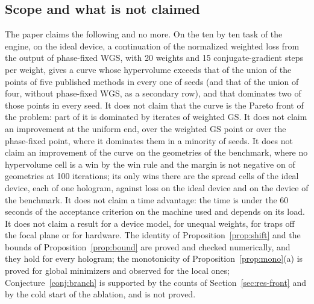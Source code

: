 \subsection{Scope and what is not claimed}\label{sec:scope}

The paper claims the following and no more. On the ten by ten task of the engine, on the ideal device, a continuation of the normalized weighted loss from the output of phase-fixed WGS, with 20 weights and 15 conjugate-gradient steps per weight, gives a curve whose hypervolume exceeds that of the union of the points of five published methods in every one of \nSeeds{} seeds (and that of the union of four, without phase-fixed WGS, as a secondary row), and that dominates two of those points in every seed. It does not claim that the curve is the Pareto front of the problem: part of it is
dominated by iterates of weighted GS. It does not claim an improvement at the uniform end, over the weighted GS point or over the phase-fixed point, where it dominates them in a minority of seeds. It does not claim an improvement of the curve on the geometries of the benchmark, where no hypervolume cell is a win by the win rule and the margin is not negative on \benchPassHundred{} of \benchNHundred{} geometries at 100 iterations; its only wins there are the \spreadWins{} spread cells of the ideal device, each of one hologram, against \spreadLosses{} loss on the ideal device and \spreadDevLosses{} on the device of the benchmark. It does not claim a time advantage: the time is under the 60 seconds of the acceptance criterion on the machine used and depends on its load. It does not claim a result for a device model, for unequal weights, for traps off the
focal plane or for hardware. The identity of Proposition~\ref{prop:shift} and the bounds of Proposition~\ref{prop:bound} are proved and checked numerically, and they hold for every hologram; the monotonicity of Proposition~\ref{prop:mono}(a) is proved for global minimizers and observed for the local ones; Conjecture~\ref{conj:branch} is supported by the counts of Section~\ref{sec:res-front} and by the cold start of the ablation, and is not proved.
